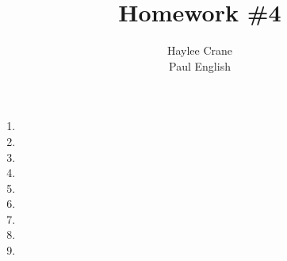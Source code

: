\documentclass[11pt, oneside]{article}
\title{Homework \#4}
\author{
Haylee Crane \\
Paul English
}
\begin{document}
\maketitle

\begin{enumerate}

\item 
\item 
\item 
\item 
\item 
\item 
\item 
\item 
\item 

\end{enumerate}
\end{document}

